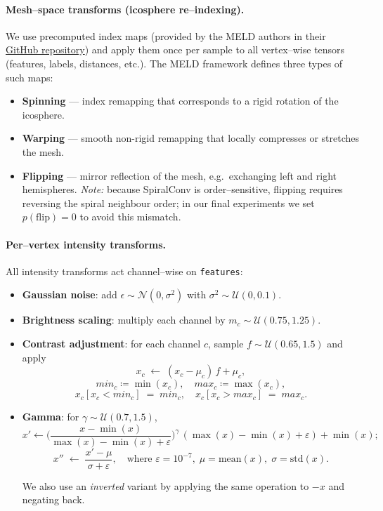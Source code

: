 \documentclass[FCD_GNN.tex]{subfiles}
\begin{document}
\paragraph{Mesh--space transforms (icosphere re–indexing).}
We use precomputed index maps (provided by the MELD authors in their \href{https://github.com/MELDProject/meld_graph/tree/main/data}{GitHub repository}) and apply them once per sample to all vertex–wise tensors (features, labels, distances, etc.). 
The MELD framework defines three types of such maps:
\begin{itemize}
  \item \textbf{Spinning} — index remapping that corresponds to a rigid rotation of the icosphere.
  \item \textbf{Warping} — smooth non-rigid remapping that locally compresses or stretches the mesh.
  \item \textbf{Flipping} — mirror reflection of the mesh, e.g.\ exchanging left and right hemispheres. \emph{Note:} because SpiralConv is order–sensitive, flipping requires reversing the spiral neighbour order; in our final experiments we set $p(\text{flip}){=}0$ to avoid this mismatch.
\end{itemize}

\paragraph{Per–vertex intensity transforms.}
All intensity transforms act channel–wise on \texttt{features}:
\begin{itemize}
\item \textbf{Gaussian noise}: add $\epsilon\sim\mathcal{N}(0,\sigma^2)$ with $\sigma^2 \sim \mathcal{U}(0,0.1)$.
\item \textbf{Brightness scaling}: multiply each channel by $m_c\sim\mathcal{U}(0.75,1.25)$.
\item \textbf{Contrast adjustment}: for each channel $c$, sample $f\sim\mathcal{U}(0.65,1.5)$ and apply
\[
x_c \;\leftarrow\; (x_c - \mu_c)\,f + \mu_c,
\]
\[min_c \coloneqq \min(x_c), \quad
max_c \coloneqq \max(x_c),
\]
\[
x_c[x_c < min_c] \;=\; min_c, \quad
x_c[x_c > max_c] \;=\; max_c.
\]
\item \textbf{Gamma}: for $\gamma\sim\mathcal{U}(0.7,1.5)$,
\[
x' \leftarrow \Big(\frac{x-\min(x)}{\max(x)-\min(x)+\varepsilon}\Big)^{\gamma}\,(\max(x)-\min(x)+\varepsilon)+\min(x);
\]
\[
x'' \;\leftarrow\; \frac{x' - \mu}{\sigma + \varepsilon},
\quad \text{where } \varepsilon = 10^{-7},\;
\mu = \mathrm{mean}(x),\;
\sigma = \mathrm{std}(x).
\]

We also use an \emph{inverted} variant by applying the same operation to $-x$ and negating back.
\end{itemize}
\end{document}
